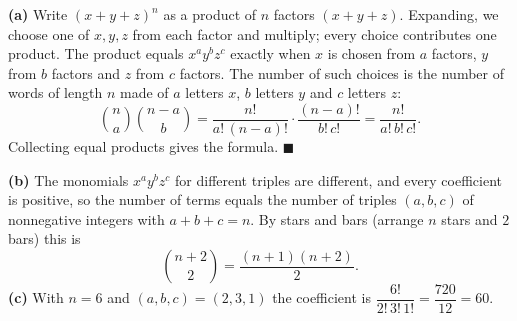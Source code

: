 \textbf{(a)} Write $(x+y+z)^n$ as a product of $n$ factors $(x+y+z)$. Expanding, we choose one of $x,y,z$ from each factor and multiply; every choice contributes one product. The product equals $x^ay^bz^c$ exactly when $x$ is chosen from $a$ factors, $y$ from $b$ factors and $z$ from $c$ factors. The number of such choices is the number of words of length $n$ made of $a$ letters $x$, $b$ letters $y$ and $c$ letters $z$:
\[\binom na\binom{n-a}{b}=\dfrac{n!}{a!\,(n-a)!}\cdot\dfrac{(n-a)!}{b!\,c!}=\dfrac{n!}{a!\,b!\,c!}.\]
Collecting equal products gives the formula. $\blacksquare$

\textbf{(b)} The monomials $x^ay^bz^c$ for different triples are different, and every coefficient is positive, so the number of terms equals the number of triples $(a,b,c)$ of nonnegative integers with $a+b+c=n$. By stars and bars (arrange $n$ stars and $2$ bars) this is
\[\boxed{\binom{n+2}{2}=\dfrac{(n+1)(n+2)}2}.\]
\textbf{(c)} With $n=6$ and $(a,b,c)=(2,3,1)$ the coefficient is $\dfrac{6!}{2!\,3!\,1!}=\dfrac{720}{12}=\boxed{60}$.
